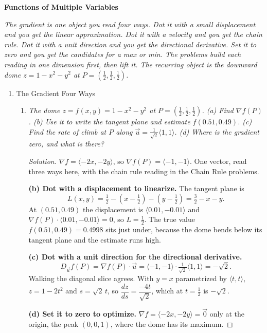 \documentclass[12pt]{article}
\newenvironment{solution}
  {\renewcommand\qedsymbol{$\blacksquare$}\begin{proof}[Solution]}
  {\end{proof}}
\newcounter{topic}
\newcommand{\grouphead}[1]{\begin{center}{\large\textbf{#1}}\end{center}}
\begin{document}
\grouphead{Functions of Multiple Variables}
\textit{The gradient is one object you read four ways. Dot it with a small displacement and you get the linear approximation. Dot it with a velocity and you get the chain rule. Dot it with a unit direction and you get the directional derivative. Set it to zero and you get the candidates for a max or min. The problems build each reading in one dimension first, then lift it. The recurring object is the downward dome $z=1-x^2-y^2$ at $P=(\tfrac12,\tfrac12,\tfrac12)$.}
\begin{enumerate}\setcounter{enumi}{\value{topic}}




\item The Gradient Four Ways

    \begin{enumerate}
    \item \textit{The dome $z=f(x,y)=1-x^2-y^2$ at $P=(\tfrac12,\tfrac12,\tfrac12)$. (a) Find $\nabla f(P)$. (b) Use it to write the tangent plane and estimate $f(0.51,0.49)$. (c) Find the rate of climb at $P$ along $\vec u=\tfrac{1}{\sqrt2}\langle1,1\rangle$. (d) Where is the gradient zero, and what is there?}

    \begin{solution}
    $\nabla f=\langle-2x,-2y\rangle$, so $\nabla f(P)=\langle-1,-1\rangle$. One vector, read three ways here, with the chain rule reading in the Chain Rule problems.

    \medskip\noindent\textbf{(b) Dot with a displacement to linearize.} The tangent plane is
    \[
      L(x,y)=\tfrac12-(x-\tfrac12)-(y-\tfrac12)=\tfrac32-x-y.
    \]
    At $(0.51,0.49)$ the displacement is $\langle0.01,-0.01\rangle$ and $\nabla f(P)\cdot\langle0.01,-0.01\rangle=0$, so $L=\tfrac12$. The true value $f(0.51,0.49)=0.4998$ sits just under, because the dome bends below its tangent plane and the estimate runs high.

    \medskip\noindent\textbf{(c) Dot with a unit direction for the directional derivative.}
    \[
      D_{\vec u}f(P)=\nabla f(P)\cdot\vec u=\langle-1,-1\rangle\cdot\tfrac{1}{\sqrt2}\langle1,1\rangle=-\sqrt2.
    \]
    Walking the diagonal slice agrees. With $y=x$ parametrized by $\langle t,t\rangle$, $z=1-2t^2$ and $s=\sqrt2\,t$, so $\dfrac{dz}{ds}=\dfrac{-4t}{\sqrt2}$, which at $t=\tfrac12$ is $-\sqrt2$.

    \medskip\noindent\textbf{(d) Set it to zero to optimize.} $\nabla f=\langle-2x,-2y\rangle=\vec0$ only at the origin, the peak $(0,0,1)$, where the dome has its maximum.
    \end{solution}


\end{enumerate}
\end{enumerate}
\end{document}
